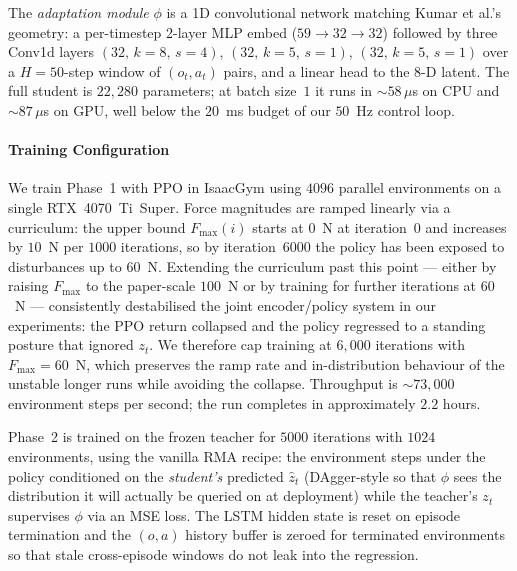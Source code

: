 The \emph{adaptation module} $\phi$ is a 1D convolutional network matching
Kumar et al.'s geometry: a per-timestep 2-layer MLP embed
($59\!\to\!32\!\to\!32$) followed by three Conv1d layers
$(32,\,k{=}8,\,s{=}4),\,(32,\,k{=}5,\,s{=}1),\,(32,\,k{=}5,\,s{=}1)$ over a
$H{=}50$-step window of $(o_t, a_t)$ pairs, and a linear head to the $8$-D
latent. The full student is $22{,}280$ parameters; at batch size~$1$ it runs
in $\sim\!58\,\mu$s on CPU and $\sim\!87\,\mu$s on GPU, well below the
$20$~ms budget of our $50$~Hz control loop.

\paragraph{Training Configuration}
\label{sec:rma_training}
We train Phase~1 with PPO in IsaacGym using $4096$ parallel environments on
a single RTX~4070~Ti~Super. Force magnitudes are ramped linearly via a
curriculum: the upper bound $F_{\max}(i)$ starts at $0$~N at iteration~$0$
and increases by $10$~N per $1000$ iterations, so by iteration~$6000$ the
policy has been exposed to disturbances up to $60$~N. Extending the
curriculum past this point --- either by raising $F_{\max}$ to the paper-scale
$100$~N or by training for further iterations at $60$~N --- consistently
destabilised the joint encoder/policy system in our experiments: the PPO
return collapsed and the policy regressed to a standing posture that
ignored $z_t$. We therefore cap training at $6{,}000$ iterations with
$F_{\max}{=}60$~N, which preserves the ramp rate and in-distribution
behaviour of the unstable longer runs while avoiding the collapse.
Throughput is $\sim\!73{,}000$ environment steps per second; the run
completes in approximately $2.2$ hours.

Phase~2 is trained on the frozen teacher for $5000$ iterations with
$1024$ environments, using the vanilla RMA recipe: the environment steps
under the policy conditioned on the \emph{student's} predicted $\hat z_t$
(DAgger-style so that $\phi$ sees the distribution it will actually be
queried on at deployment) while the teacher's $z_t$ supervises $\phi$
via an MSE loss. The LSTM hidden state is reset on episode termination
and the $(o,a)$ history buffer is zeroed for terminated environments
so that stale cross-episode windows do not leak into the regression.

